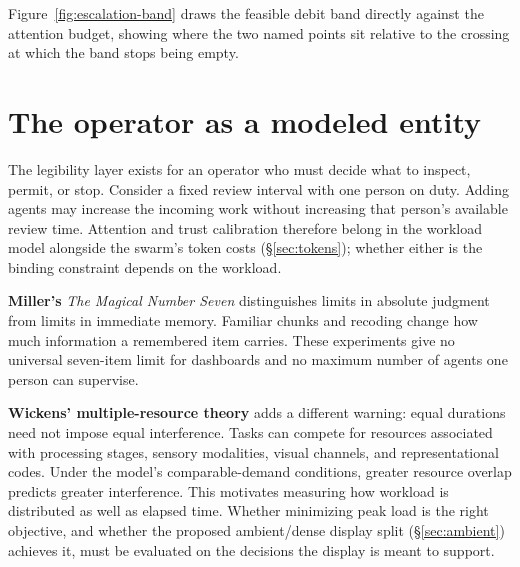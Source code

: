 \documentclass[11pt,a4paper]{article}
\theoremstyle{definition}
\theoremstyle{plain}
\begin{document}


Figure~\ref{fig:escalation-band} draws the feasible debit band directly
against the attention budget, showing where the two named points sit
relative to the crossing at which the band stops being empty.



\section{The operator as a modeled entity}\label{sec:operator}

The legibility layer exists for an operator who must decide what to inspect,
permit, or stop. Consider a fixed review interval with one person on duty. Adding
agents may increase the incoming work without increasing that person's available
review time. Attention and trust calibration therefore belong in the workload
model alongside the swarm's token costs (\S\ref{sec:tokens}); whether either is
the binding constraint depends on the workload.


\textbf{Miller's} \emph{The Magical Number Seven}
distinguishes limits in absolute judgment from limits in immediate memory. Familiar
chunks and recoding change how much information a remembered item carries. These
experiments give no universal seven-item limit for dashboards and no
maximum number of agents one person can supervise.

\textbf{Wickens' multiple-resource theory} adds a different
warning: equal durations need not impose equal interference. Tasks can compete
for resources associated with processing stages, sensory modalities, visual
channels, and representational codes. Under the model's comparable-demand
conditions, greater resource overlap predicts greater interference. This
motivates measuring how workload is distributed as well as elapsed time. Whether
minimizing peak load is the right objective, and whether the proposed
ambient/dense display split (\S\ref{sec:ambient}) achieves it, must be evaluated
on the decisions the display is meant to support.
\end{document}
